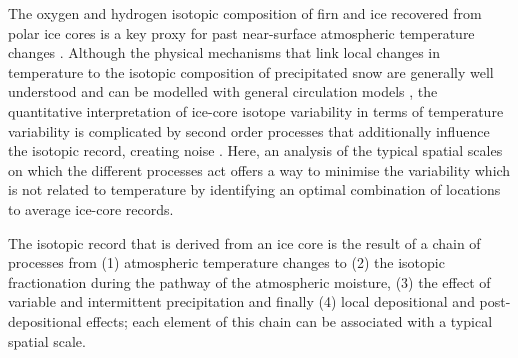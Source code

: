 \documentclass[cp, manuscript, draft]{copernicus}
\begin{document}

\introduction

The oxygen and hydrogen isotopic composition of firn and ice recovered from
polar ice cores is a key proxy for past near-surface atmospheric temperature
changes \citep{Dansgaard1964,Lorius1969,Masson-Delmotte2008,Sjolte2011}.
Although the physical mechanisms that link local changes in temperature to the
isotopic composition of precipitated snow are generally well understood
\citep{Dansgaard1964,Craig1965,Jouzel1984} and can be modelled with general
circulation models
\citep{Joussaume1984,Werner2011,Werner2016,Sjolte2011,Goursaud2018}, the
quantitative interpretation of ice-core isotope variability in terms of
temperature variability is complicated by second order processes that
additionally influence the isotopic record, creating noise \citep{Munch2018a}.
Here, an analysis of the typical spatial scales on which the different processes
act offers a way to minimise the variability which is not related to temperature
by identifying an optimal combination of locations to average ice-core records.

The isotopic record that is derived from an ice core is the result of a chain of
processes from (1) atmospheric temperature changes to (2) the isotopic
fractionation during the pathway of the atmospheric moisture, (3) the effect of
variable and intermittent precipitation and finally (4) local depositional and
post-depositional effects; each element of this chain can be associated with a
typical spatial scale.
\end{document}
